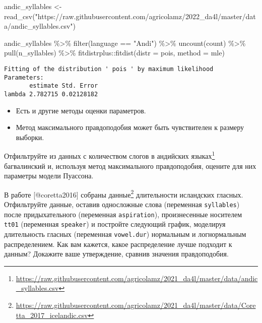 \documentclass[
]{book}
\makeatletter
\newenvironment{Shaded}{\begin{snugshade}}{\end{snugshade}}
\newcommand{\AttributeTok}[1]{\textcolor[rgb]{0.77,0.63,0.00}{#1}}
\newcommand{\FunctionTok}[1]{\textcolor[rgb]{0.00,0.00,0.00}{#1}}
\newcommand{\NormalTok}[1]{#1}
\newcommand{\OtherTok}[1]{\textcolor[rgb]{0.56,0.35,0.01}{#1}}
\newcommand{\SpecialCharTok}[1]{\textcolor[rgb]{0.00,0.00,0.00}{#1}}
\newcommand{\StringTok}[1]{\textcolor[rgb]{0.31,0.60,0.02}{#1}}
\providecommand{\tightlist}{%
  \setlength{\itemsep}{0pt}\setlength{\parskip}{0pt}}
\renewcommand{\href}[2]{#2\footnote{\url{#1}}}
\newenvironment{kframe}{%
    \medskip{}
    \setlength{\fboxsep}{.8em}
    \def\at@end@of@kframe{}%
    \ifinner\ifhmode%
    \def\at@end@of@kframe{\end{minipage}}%
    \begin{minipage}{\columnwidth}%
    \fi\fi%
    \def\FrameCommand##1{\hskip\@totalleftmargin \hskip-\fboxsep
    \colorbox{shadecolor}{##1}\hskip-\fboxsep
        \hskip-\linewidth \hskip-\@totalleftmargin \hskip\columnwidth}%
    \MakeFramed {\advance\hsize-\width
      \@totalleftmargin\z@ \linewidth\hsize
      \@setminipage}}%
  {\par\unskip\endMakeFramed%
    \at@end@of@kframe}
\newenvironment{rmdblock}[1]
  {
    \begin{itemize}
    \renewcommand{\labelitemi}{
      \raisebox{-.7\height}[0pt][0pt]{
        {\setkeys{Gin}{width=3em,keepaspectratio}\texttt{[image: images/\#1]}}
        }
        }
        \setlength{\fboxsep}{1em}
        \begin{kframe}
        \item
      }
      {
        \end{kframe}
        \end{itemize}
      }
\newenvironment{rmdtask}
      {\begin{rmdblock}{task}}
      {\end{rmdblock}}
\makeatother
\begin{document}
\begin{Shaded}
\begin{Highlighting}[]
\NormalTok{andic\_syllables }\OtherTok{\textless{}{-}} \FunctionTok{read\_csv}\NormalTok{(}\StringTok{"https://raw.githubusercontent.com/agricolamz/2022\_da4l/master/data/andic\_syllables.csv"}\NormalTok{) }

\NormalTok{andic\_syllables }\SpecialCharTok{\%\textgreater{}\%} 
  \FunctionTok{filter}\NormalTok{(language }\SpecialCharTok{==} \StringTok{"Andi"}\NormalTok{) }\SpecialCharTok{\%\textgreater{}\%} 
  \FunctionTok{uncount}\NormalTok{(count) }\SpecialCharTok{\%\textgreater{}\%} 
  \FunctionTok{pull}\NormalTok{(n\_syllables) }\SpecialCharTok{\%\textgreater{}\%} 
\NormalTok{  fitdistrplus}\SpecialCharTok{::}\FunctionTok{fitdist}\NormalTok{(}\AttributeTok{distr =} \StringTok{\textquotesingle{}pois\textquotesingle{}}\NormalTok{, }\AttributeTok{method =} \StringTok{\textquotesingle{}mle\textquotesingle{}}\NormalTok{)}
\end{Highlighting}
\end{Shaded}

\begin{verbatim}
Fitting of the distribution ' pois ' by maximum likelihood 
Parameters:
       estimate Std. Error
lambda 2.782715 0.02128182
\end{verbatim}

\begin{itemize}
\tightlist
\item
  Есть и другие методы оценки параметров.
\item
  Метод максимального правдоподобия может быть чувствителен к размеру выборки.
\end{itemize}

\begin{rmdtask}
Отфильтруйте из
\href{https://raw.githubusercontent.com/agricolamz/2021_da4l/master/data/andic_syllables.csv}{данных
с количеством слогов в андийских языках} багвалинский и, используя метод
максимального правдоподобия, оцените для них параметры модели Пуассона.
\end{rmdtask}

\begin{rmdtask}
В работе {[}@coretta2016{]} собраны
\href{https://raw.githubusercontent.com/agricolamz/2021_da4l/master/data/Coretta_2017_icelandic.csv}{данные}
длительности исландских гласных. Отфильтруйте данные, оставив
односложные слова (переменная \texttt{syllables}) после придыхательного
(переменная \texttt{aspiration}), произнесенные носителем \texttt{tt01}
(переменная \texttt{speaker}) и постройте следующий график, моделируя
длительность гласных (переменная \texttt{vowel.dur}) нормальным и
логнормальным распределением. Как вам кажется, какое распределение лучше
подходит к данным? Докажите ваше утверждение, сравнив значения
правдоподобия.
\end{rmdtask}
\end{document}
